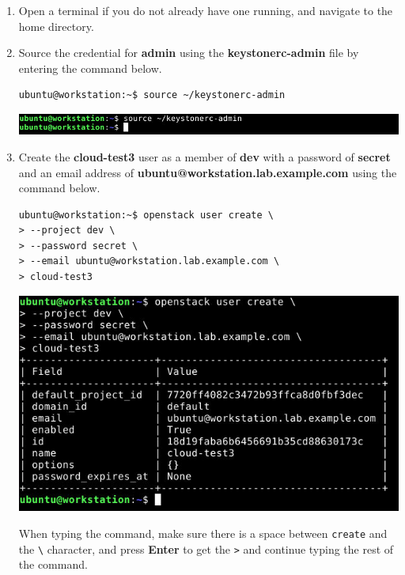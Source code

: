 \documentclass[letterpaper, 12pt]{article}
\begin{document}
\begin{enumerate}
    \item Open a terminal if you do not already have one running, and navigate to the home directory.
    
    \item Source the credential for \textbf{admin} using the \textbf{keystonerc-admin} file by entering the command
    below.
\begin{lstlisting}
ubuntu@workstation:~$ source ~/keystonerc-admin
\end{lstlisting}

    \begin{center}
        \includegraphics[width=\linewidth]{images/part4/step2.png}
    \end{center}

    \item Create the \textbf{cloud-test3} user as a member of \textbf{dev} with a password of \textbf{secret} and an
    email address of \textbf{ubuntu@workstation.lab.example.com} using the command below.
\begin{lstlisting}
ubuntu@workstation:~$ openstack user create \
> --project dev \
> --password secret \
> --email ubuntu@workstation.lab.example.com \
> cloud-test3
\end{lstlisting}

    \begin{center}
        \includegraphics[width=\linewidth]{images/part4/step3.png}
    \end{center}

    \begin{tipbox}{}
        When typing the command, make sure there is a space between \texttt{create} and the \texttt{\textbackslash}
        character, and press \textbf{Enter} to get the \texttt{>} and continue typing the rest of the command.
    \end{tipbox}


\end{enumerate}
\end{document}
